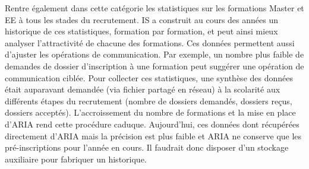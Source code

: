 \documentclass{book}
\begin{document}
Rentre également dans cette catégorie les statistiques sur les formations
Master et EE à tous les stades du recrutement. IS a construit au cours 
des années un historique de ces statistiques, formation par formation,
et peut ainsi mieux analyser l'attractivité de chacune des formations.
Ces données permettent aussi d'ajuster les opérations de communication.
Par exemple, un nombre plus faible de demandes de dossier d'inscription 
à une formation peut suggérer une opération de communication ciblée.
Pour collecter ces statistiques, une synthèse des données était auparavant
demandée (via fichier partagé en réseau) à la scolarité aux différents 
étapes du recrutement (nombre de dossiers demandés, dossiers reçus, 
dossiers acceptés). 
L'accroissement du nombre de formations et la mise en place d'ARIA rend 
cette procédure caduque. Aujourd'hui, ces données dont récupérées
directement d'ARIA mais la précision est plus faible et ARIA ne 
conserve que les pré-inscriptions pour l'année en cours. Il faudrait
donc disposer d'un stockage auxiliaire pour fabriquer un historique.
\end{document}
